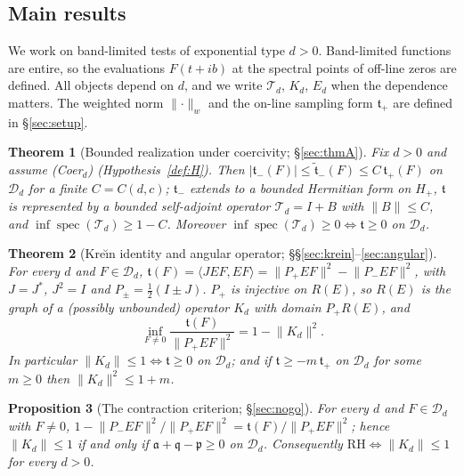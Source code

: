 \documentclass[11pt]{amsart}
\newtheorem{theorem}{Theorem}[section]
\newtheorem{proposition}[theorem]{Proposition}
\theoremstyle{definition}
\theoremstyle{remark}
\newcommand{\spec}{\operatorname{spec}}
\newcommand{\half}{\tfrac12}
\newcommand{\tform}{\mathfrak t}
\newcommand{\tplus}{\mathfrak t_+}
\newcommand{\tminus}{\mathfrak t_-}
\newcommand{\ttilde}{\widetilde{\mathfrak t}_-}
\newcommand{\Hplus}{H_+}
\newcommand{\rmar}{\mathfrak a}
\newcommand{\rmq}{\mathfrak q}
\newcommand{\rmp}{\mathfrak p}
\newcommand{\Top}{\mathcal T}
\newcommand{\Kop}{K}
\newcommand{\Norm}[1]{\lVert #1 \rVert}
\begin{document}
\subsection{Main results}
We work on band-limited tests of exponential type $d>0$. Band-limited functions are
entire, so the evaluations $F(t+ib)$ at the spectral points of off-line zeros are defined.
All objects depend on $d$, and we write $\Top_d$, $\Kop_d$, $E_d$ when the dependence
matters. The weighted norm $\Norm{\cdot}_w$ and the on-line sampling form $\tplus$ are
defined in \S\ref{sec:setup}.

\begin{theorem}[Bounded realization under coercivity; \S\ref{sec:thmA}]\label{thm:A}
Fix $d>0$ and assume \textnormal{(Coer$_d$)} \textnormal{(Hypothesis~\ref{def:H})}. Then
$|\tminus(F)|\le\ttilde(F)\le C\,\tplus(F)$ on $\mathcal D_d$ for a finite
$C=C(d,c)$; $\tminus$ extends to a bounded Hermitian form on $\Hplus$, $\tform$ is
represented by a bounded self-adjoint operator $\Top_d=I+B$ with $\Norm{B}\le C$, and
$\inf\spec(\Top_d)\ge1-C$. Moreover $\inf\spec(\Top_d)\ge0\iff\tform\ge0$ on $\mathcal D_d$.
\end{theorem}

\begin{theorem}[Kre\u{\i}n identity and angular operator; \S\S\ref{sec:krein}--\ref{sec:angular}]\label{thm:B}
For every $d$ and $F\in\mathcal D_d$, $\tform(F)=\langle JEF,EF\rangle
=\Norm{P_+EF}^{2}-\Norm{P_-EF}^{2}$, with $J=J^{*}$, $J^{2}=I$ and $P_\pm=\half(I\pm J)$.
$P_+$ is injective on $R(E)$, so $R(E)$ is the graph of a \textup{(}possibly
unbounded\textup{)} operator $\Kop_d$ with domain $P_+R(E)$, and
\[
\inf_{F\ne0}\frac{\tform(F)}{\Norm{P_+EF}^{2}}=1-\Norm{\Kop_d}^{2}.
\]
In particular $\Norm{\Kop_d}\le1\iff\tform\ge0$ on $\mathcal D_d$; and if
$\tform\ge-m\,\tplus$ on $\mathcal D_d$ for some $m\ge0$ then $\Norm{\Kop_d}^{2}\le1+m$.
\end{theorem}

\begin{proposition}[The contraction criterion; \S\ref{sec:nogo}]\label{thm:C}
For every $d$ and $F\in\mathcal D_d$ with $F\ne0$,
$1-\Norm{P_-EF}^{2}/\Norm{P_+EF}^{2}=\tform(F)/\Norm{P_+EF}^{2}$; hence
$\Norm{\Kop_d}\le1$ if and only if $\rmar+\rmq-\rmp\ge0$ on $\mathcal D_d$. Consequently
$\mathrm{RH}\iff\Norm{\Kop_d}\le1$ for every $d>0$.
\end{proposition}
\end{document}

